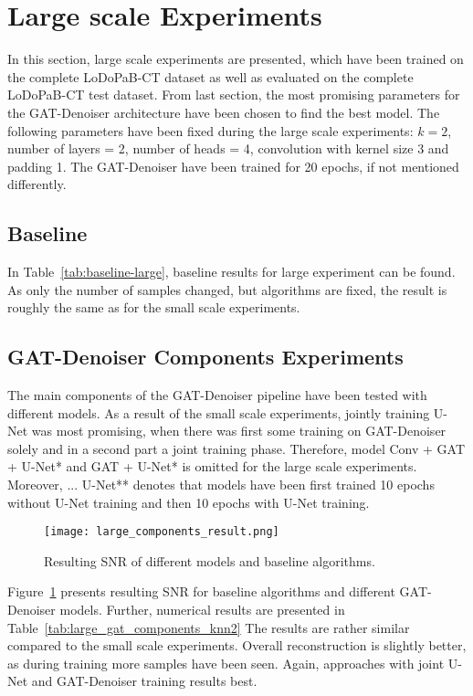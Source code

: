 \section{Large scale Experiments}

In this section, large scale experiments are presented, which have been trained on the complete LoDoPaB-CT dataset
as well as evaluated on the complete LoDoPaB-CT test dataset.
From last section, the most promising parameters for the GAT-Denoiser architecture have been chosen
to find the best model. The following parameters have been fixed during the large scale experiments:
$k=2$, number of layers = 2, number of heads = 4, convolution with kernel size 3 and padding 1.
The GAT-Denoiser have been trained for 20 epochs, if not mentioned differently.


\subsection{Baseline}
In Table~\ref{tab:baseline-large}, baseline results for large experiment can be found.
As only the number of samples changed, but algorithms are fixed, the result is roughly 
the same as for the small scale experiments.

\subsection{GAT-Denoiser Components Experiments}
The main components of the GAT-Denoiser pipeline have been tested with different models.
As a result of the small scale experiments, jointly training U-Net was most promising, 
when there was first some training on GAT-Denoiser solely and in a second part a joint training phase.
Therefore, model {Conv + GAT + U-Net*} and {GAT + U-Net*} is omitted for the large scale experiments.
Moreover, {... U-Net**} denotes that models have been first trained 10 epochs without
U-Net training and then 10 epochs with U-Net training.


\begin{figure}[H]
  \centering
  \texttt{[image: large\_components\_result.png]}
  \caption{Resulting SNR of different models and baseline algorithms.}
  \label{fig:large_components}
\end{figure}

Figure~\ref{fig:large_components} presents resulting SNR for baseline algorithms and 
different GAT-Denoiser models. Further, numerical results are presented in Table~\ref{tab:large_gat_components_knn2}
The results are rather similar compared to the small scale experiments.
Overall reconstruction is slightly better, as during training more samples have been seen.
Again, approaches with joint U-Net and GAT-Denoiser training results best.

